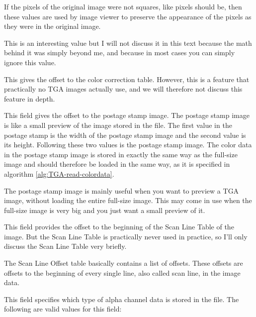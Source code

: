 
If the pixels of the original image were not squares, like pixels
should be, then these values are used by image viewer to preserve the
appearance of the pixels as they were in the original image.


This is an interesting value but I will not discuss it in this text
because the math behind it was simply beyond me, and because in most
cases you can simply ignore this value.


This gives the offset to the color correction table. However, this is
a feature that practically no TGA images actually use, and we will
therefore not discuss this feature in depth.


This field gives the offset to the postage stamp image. The postage
stamp image is like a small preview of the image stored in the
file. The first value in the postage stamp is the width of the postage
stamp image and the second value is its height. Following these two
values is the postage stamp image. The color data in the postage stamp
image is stored in exactly the same way as the full-size image and
should therefore be loaded in the same way, as it is specified in
algorithm \ref{alg:TGA-read-colordata}.

The postage stamp image is mainly useful when you want to preview a
TGA image, without loading the entire full-size image. This may come
in use when the full-size image is very big and you just want a small
preview of it.


This field provides the offset to the beginning of the Scan Line Table
of the image. But the Scan Line Table is practically never used in
practice, so I'll only discuss the Scan Line Table very briefly.

The Scan Line Offset table basically contains a list of offsets. These
offsets are offsets to the beginning of every single line, also called
scan line, in the image data.


This field specifies which type of alpha channel data is stored in the
file. The following are valid values for this field:

